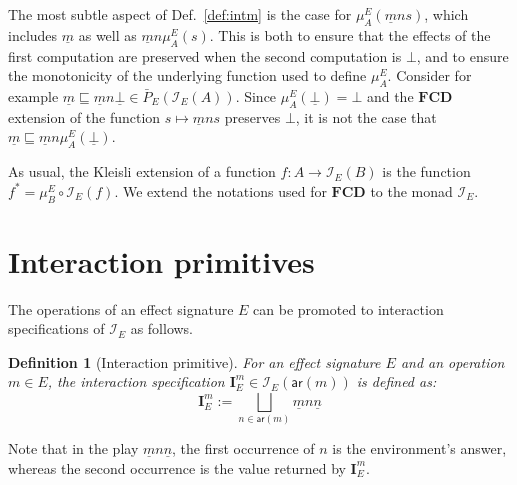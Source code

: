 \documentclass[draft,11pt]{report}
\newtheorem{definition}{Definition}
\newcommand{\kw}[1]{\ensuremath{ \mathsf{#1} }}
\begin{document}

The most subtle aspect of Def.~\ref{def:intm}
is the case for $\mu^E_A(\underline{m} n s)$,
which includes $\underline{m}$ as well as $\underline{m} n \mu^E_A(s)$.
This is both
to ensure that the effects of the first computation are preserved
when the second computation is $\bot$, and
to ensure the monotonicity of the underlying function
used to define $\mu^E_A$.
Consider for example
$\underline{m} \sqsubseteq
 \underline{m} n \underline{\bot} \in \bar{P}_E(\mathcal{I}_E(A))$.
Since $\mu^E_A(\underline{\bot}) = \bot$ and
the $\mathbf{FCD}$ extension
of the function $s \mapsto \underline{m} n s$
preserves $\bot$,
it is not the case that
$\underline{m} \sqsubseteq
 \underline{m} n \mu^E_A(\underline{\bot})$.

As usual,
the Kleisli extension of a function $f : A \rightarrow \mathcal{I}_E(B)$
is the function $f^* = \mu^E_B \circ \mathcal{I}_E(f)$.
We extend the notations used for $\mathbf{FCD}$
to the monad $\mathcal{I}_E$.



\section{Interaction primitives} %

The operations of an effect signature $E$
can be promoted to interaction specifications of $\mathcal{I}_E$
as follows.

\begin{definition}[Interaction primitive]
For an effect signature $E$ and
an operation $m \in E$,
the interaction specification
$\mathbf{I}_E^m \in \mathcal{I}_E(\kw{ar}(m))$
is defined as:
\[
  \mathbf{I}_E^m :=
    \bigsqcup_{n \in \kw{ar}(m)} \underline{m} n \underline{n}
\]
\end{definition}
Note that in the play $\underline{m} n \underline{n}$,
the first occurrence of $n$ is the environment's answer,
whereas the second occurrence is the value returned by $\mathbf{I}_E^m$.
\end{document}
